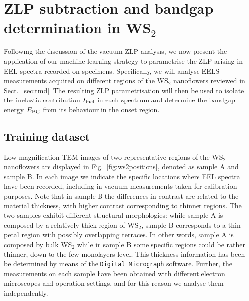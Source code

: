 \section{ZLP subtraction and bandgap determination in WS$_2$}
\label{sec:results_sample}

Following the discussion of the vacuum ZLP analysis, we now
present the application of our machine learning strategy to parametrise the ZLP
arising in EEL spectra recorded on specimens.
%
Specifically, we will analyse EELS measurements acquired on different regions
of the WS$_2$ nanoflowers reviewed in Sect.~\ref{sec:tmd}.
%
The resulting ZLP parametrisation will then be used to isolate the inelastic
contribution $I_{\rm inel}$ in each spectrum and determine the bandgap energy $E_{\rm BG}$ from
its behaviour in the onset region.

\subsection{Training dataset}
%
Low-magnification TEM images of two representative regions of
the WS$_2$ nanoflowers are displayed in Fig.~\ref{fig:ws2positions},
denoted as sample A and sample B.
%
In each image we indicate the specific locations where
EEL spectra have been recorded, including in-vacuum measurements taken
for calibration purposes.
%
Note that in sample B  the differences in contrast are related to the material
thickness, with higher contrast corresponding to thinner regions.
%
The two samples exhibit different structural morphologies: while sample A is composed
by a relatively thick region of WS$_2$, sample B corresponds to a thin petal region
with possibly overlapping terraces.
%
In other words, sample A is composed by bulk WS$_2$ while in sample B some specific regions
could be rather thinner, down to the few monolayers level.
%
This thickness information has been be determined
by means of the {\tt Digital~Micrograph}  software.
%
Further, the measurements on each sample have
been obtained with different electron microscopes and
operation settings, and for this reason
we analyse them independently.

